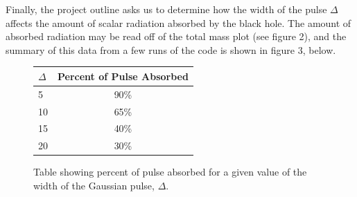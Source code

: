 \documentclass[12pt]{article}
\numberwithin{equation}{section}
\begin{document}
Finally, the project outline asks us to determine how the width of the pulse $\Delta$ affects the amount of scalar radiation absorbed by the black hole.  The amount of absorbed radiation may be read off of the total mass plot (see figure 2), and the summary of this data from a few runs of the code is shown in figure 3, below.
\begin{figure}[h!]
	\centering
	\begin{tabular}{ l | c }
		$\Delta$ & Percent of Pulse Absorbed  \\
		\hline
		\hline
		5  & 90\% \\
		10 & 65\% \\
		15 & 40\% \\
		20 & 30\%
	\end{tabular}
	\caption{Table showing percent of pulse absorbed for a given value of the width of the Gaussian pulse, $\Delta$.}
\end{figure}
	
\end{document}
